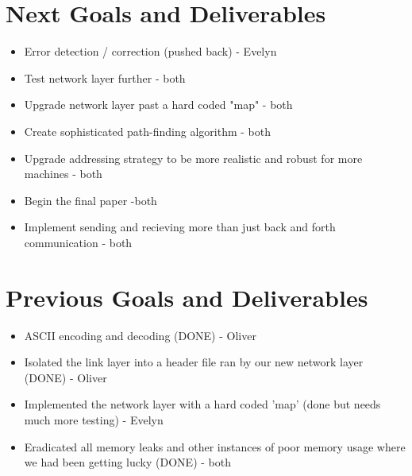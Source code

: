 \documentclass{article}
\begin{document}
\section*{Next Goals and Deliverables}
\begin{itemize}
\item Error detection / correction (pushed back) - Evelyn
\item Test network layer further - both
\item Upgrade network layer past a hard coded "map" - both
\item Create sophisticated path-finding algorithm - both
\item Upgrade addressing strategy to be more realistic and robust for more machines - both
\item Begin the final paper -both
\item Implement sending and recieving more than just back and forth communication - both 
\end{itemize}
\section*{Previous Goals and Deliverables}
\begin{itemize}
\item ASCII encoding and decoding (DONE) - Oliver
\item Isolated the link layer into a header file ran by our new network layer (DONE) - Oliver 
\item Implemented the network layer with a hard coded 'map' (done but needs much more testing) - Evelyn
\item Eradicated all memory leaks and other instances of poor memory usage where we had been getting lucky (DONE) - both 
\end{itemize}
\end{document}
